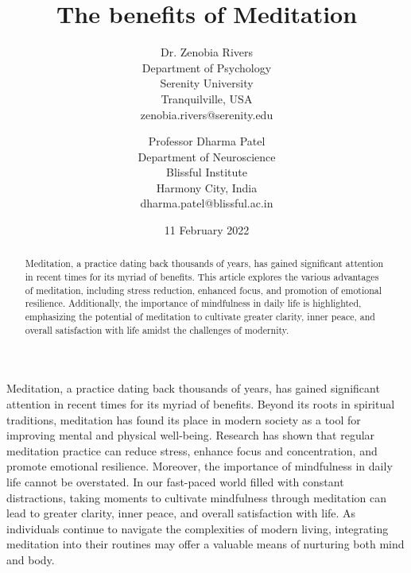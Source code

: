 \documentclass{article}[12pt]
\begin{document}
 
	\date{11 February 2022}
	
	\title{The benefits of Meditation}
	
	
	\author{Dr. Zenobia Rivers\\
		Department of Psychology\\
		Serenity University\\
    	Tranquilville, USA\\
        zenobia.rivers@serenity.edu \and 
        Professor Dharma Patel \\
        Department of Neuroscience \\ 
        Blissful Institute \\
        Harmony City, India \\
        dharma.patel@blissful.ac.in
} 

    
	\maketitle
		
	\begin{abstract}
		Meditation, a practice dating back thousands of years, has gained significant attention in recent times for its myriad of benefits. This article explores the various advantages of meditation, including stress reduction, enhanced focus, and promotion of emotional resilience. Additionally, the importance of mindfulness in daily life is highlighted, emphasizing the potential of meditation to cultivate greater clarity, inner peace, and overall satisfaction with life amidst the challenges of modernity.  
	\end{abstract}

   Meditation, a practice dating back thousands of years, has gained significant attention in recent times for its myriad of benefits. Beyond its roots in spiritual traditions, meditation has found its place in modern society as a tool for improving mental and physical well-being. Research has shown that regular meditation practice can reduce stress, enhance focus and concentration, and promote emotional resilience. Moreover, the importance of mindfulness in daily life cannot be overstated. In our fast-paced world filled with constant distractions, taking moments to cultivate mindfulness through meditation can lead to greater clarity, inner peace, and overall satisfaction with life. As individuals continue to navigate the complexities of modern living, integrating meditation into their routines may offer a valuable means of nurturing both mind and  body. 
   

		
\end{document}
